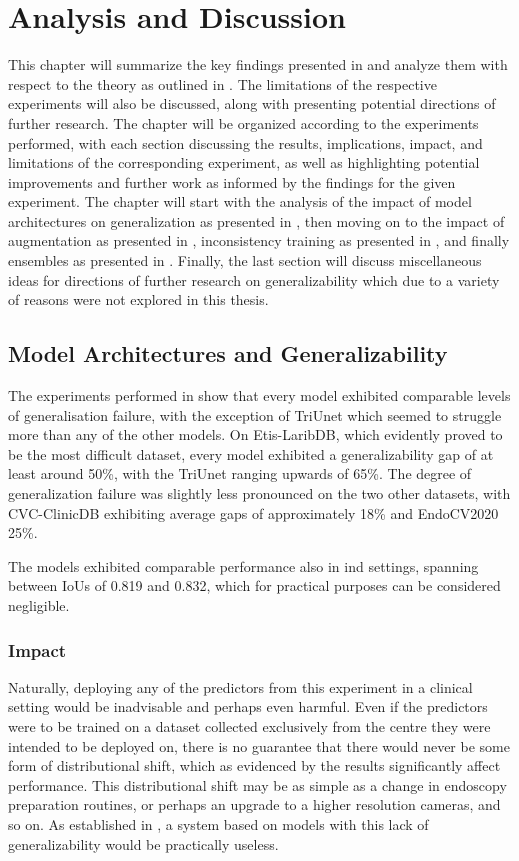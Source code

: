 \chapter{Analysis and Discussion}\label{discussion}
This chapter will summarize the key findings presented in  and analyze them with respect to the theory as outlined in . The limitations of the respective experiments will also be discussed, along with presenting potential directions of further research. The chapter will be organized according to the experiments performed, with each section discussing the results, implications, impact, and limitations of the corresponding experiment, as well as highlighting potential improvements and further work as informed by the findings for the given experiment. The chapter will start with the analysis of the impact of model architectures on generalization as presented in , then moving on to the impact of augmentation as presented in , inconsistency training as presented in , and finally ensembles as presented in . Finally, the last section will discuss miscellaneous ideas for directions of further research on generalizability which due to a variety of reasons were not explored in this thesis. 


\section{Model Architectures and Generalizability}
The experiments performed in  show that every model exhibited comparable levels of generalisation failure, with the exception of TriUnet which seemed to struggle more than any of the other models. On Etis-LaribDB, which evidently proved to be the most difficult dataset, every model exhibited a generalizability gap of at least around 50\%, with the TriUnet ranging upwards of 65\%. The degree of generalization failure was slightly less pronounced on the two other datasets, with CVC-ClinicDB exhibiting average gaps of approximately 18\% and EndoCV2020 25\%. 

The models exhibited comparable performance also in \gls{ind} settings, spanning between IoUs of 0.819 and 0.832, which for practical purposes can be considered negligible. 

\subsection{Impact}
Naturally, deploying any of the predictors from this experiment in a clinical setting would be inadvisable and perhaps even harmful. Even if the predictors were to be trained on a dataset collected exclusively from the centre they were intended to be deployed on, there is no guarantee that there would never be some form of distributional shift, which as evidenced by the results significantly affect performance. This distributional shift may be as simple as a change in endoscopy preparation routines, or perhaps an upgrade to a higher resolution cameras, and so on. As established in , a system based on models with this lack of generalizability would be practically useless. 

